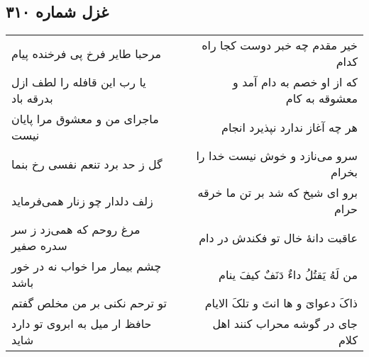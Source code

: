 \begin{center}
\section*{غزل شماره ۳۱۰}
\label{sec:sh310}
\begin{longtable}{l p{0.5cm} r}
مرحبا طایر فرخ پی فرخنده پیام
&&
خیر مقدم چه خبر دوست کجا راه کدام
\\
یا رب این قافله را لطف ازل بدرقه باد
&&
که از او خصم به دام آمد و معشوقه به کام
\\
ماجرای من و معشوق مرا پایان نیست
&&
هر چه آغاز ندارد نپذیرد انجام
\\
گل ز حد برد تنعم نفسی رخ بنما
&&
سرو می‌نازد و خوش نیست خدا را بخرام
\\
زلف دلدار چو زنار همی‌فرماید
&&
برو ای شیخ که شد بر تن ما خرقه حرام
\\
مرغ روحم که همی‌زد ز سر سدره صفیر
&&
عاقبت دانهٔ خال تو فکندش در دام
\\
چشم بیمار مرا خواب نه در خور باشد
&&
من لَهُ یَقتُلُ داءٌ دَنَفٌ کیفَ ینام
\\
تو ترحم نکنی بر من مخلص گفتم
&&
ذاکَ دعوایَ و ها انتَ و تلکَ الایام
\\
حافظ ار میل به ابروی تو دارد شاید
&&
جای در گوشه محراب کنند اهل کلام
\\
\end{longtable}
\end{center}
